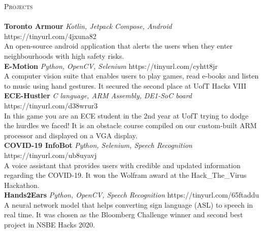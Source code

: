 \documentclass[a4paper]{article}
\newcommand{\lineunder} {
    \vspace*{-8pt} \\
    \hspace*{-18pt} \hrulefill \\
}
\newcommand{\header} [1] {
    {\hspace*{-18pt}\vspace*{6pt} \textsc{#1}}
    \vspace*{-6pt} \lineunder
}
\begin{document}
\header{Projects}
{\textbf{Toronto Armour}} {\sl Kotlin, Jetpack Compose, Android} \hfill https://tinyurl.com/4jxuna82\\
An open-source android application that alerts the users when they enter neighbourhoods with high safety risks.\\
\vspace*{2mm}
{\textbf{E-Motion}} {\sl Python, OpenCV, Selenium} \hfill https://tinyurl.com/cyhtt8jr\\
A computer vision suite that enables users to play games, read e-books and listen to music using hand gestures. It secured the second place at UofT Hacks VIII\\
\vspace*{2mm}
{\textbf{ECE-Hustler}} {\sl C language, ARM Assembly, DE1-SoC board} \hfill https://tinyurl.com/d38wrur3\\
In this game you are an ECE student in the 2nd year at UofT trying to dodge the hurdles we faced! It is an obstacle course compiled on our custom-built ARM processor and displayed on a VGA display.\\
\vspace*{2mm}
{\textbf{COVID-19 InfoBot}} {\sl Python, Selenium, Speech Recognition} \hfill https://tinyurl.com/ub8uyavj\\
A voice assistant that provides users with credible and updated information regarding the COVID-19. It won the Wolfram award at the Hack\_The\_Virus Hackathon.\\
\vspace*{2mm}
{\textbf{Hands2Ears}} {\sl Python, OpenCV, Speech Recognition} \hfill https://tinyurl.com/65ftaddu\\
A neural network model that helps converting sign language (ASL) to speech in real time. It was chosen as the Bloomberg Challenge winner and second best project in NSBE Hacks 2020.\\
\vspace*{2mm}
\end{document}
